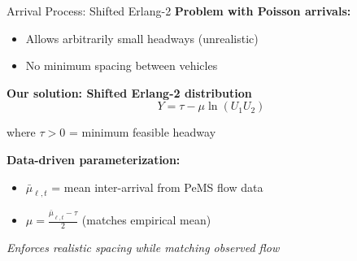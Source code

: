 \documentclass[aspectratio=169]{beamer}
\begin{document}
    \begin{frame}{Arrival Process: Shifted Erlang-2}
        \textbf{Problem with Poisson arrivals:}
        \begin{itemize}
            \item Allows arbitrarily small headways (unrealistic)
            \item No minimum spacing between vehicles
        \end{itemize}

        \vspace{0.5em}
        \textbf{Our solution: Shifted Erlang-2 distribution}
        \begin{equation*}
            Y = \tau - \mu \ln(U_1 U_2)
        \end{equation*}

        where $\tau > 0$ = minimum feasible headway

        \vspace{0.5em}
        \textbf{Data-driven parameterization:}
        \begin{itemize}
            \item $\bar{\mu}_{\ell,t}$ = mean inter-arrival from PeMS flow data
            \item $\mu = \frac{\bar{\mu}_{\ell,t} - \tau}{2}$ (matches empirical mean)
        \end{itemize}

        \textit{Enforces realistic spacing while matching observed flow}
    \end{frame}
\end{document}
